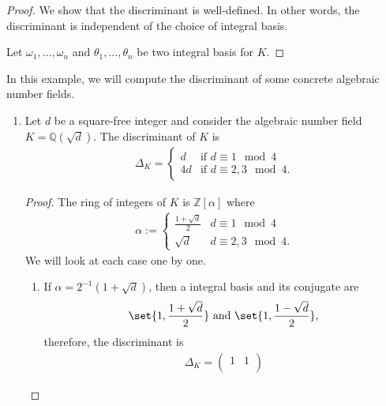 \begin{proof}
    We show that the discriminant is well-defined. In other words, the discriminant is independent of the choice of integral basis.

    Let \(\omega_1, \ldots, \omega_n\) and \(\theta_1, \ldots, \theta_n\) be two integral basis for \(K\).
\end{proof}

\begin{example}
    In this example, we will compute the discriminant of some concrete algebraic number fields.
    \begin{enumerate}
        \item Let \(d\) be a square-free integer and consider the algebraic number field \(K = \mathbb{Q}(\sqrt{d})\). The discriminant of \(K\) is
        \begin{align*}
            \Delta_K = \begin{cases}
                d & \text{if \(d \equiv 1 \mod{4}\)}\\
                4d & \text{if \(d \equiv 2, 3 \mod{4}\).}
            \end{cases}
        \end{align*}
        \begin{proof}
            The ring of integers of \(K\) is \(\mathbb{Z}[\alpha]\) where
            \begin{align*}
                \alpha := \begin{cases}
                    \frac{1 + \sqrt{d}}{2} & d \equiv 1 \mod{4} \\
                    \sqrt{d} & d \equiv 2, 3 \mod{4} \text{.}
                \end{cases}
            \end{align*}
            We will look at each case one by one.
            \begin{enumerate}
                \item If \(\alpha = 2^{-1}(1 + \sqrt{d})\), then a integral basis and its conjugate are
                \begin{align*}
                    \set{1, \frac{1 + \sqrt{d}}{2}} \text{ and } \set{1, \frac{1 - \sqrt{d}}{2}} \text{,}
                \end{align*}
                therefore, the discriminant is
                \begin{align*}
                    \Delta_K = \begin{pmatrix}
                        1 & 1 \\

\end{pmatrix}
\end{align*}
\end{enumerate}
\end{proof}
\end{enumerate}
\end{example}
